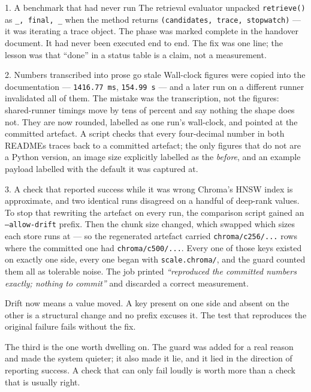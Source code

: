 \documentclass[11pt,a4paper]{article}
\newcommand{\code}[1]{\texttt{\small #1}}
\begin{document}
\begin{finding}{1. A benchmark that had never run}
The retrieval evaluator unpacked \code{retrieve()} as
\code{\_, final, \_} when the method returns
\code{(candidates, trace, stopwatch)} --- it was iterating a trace object. The
phase was marked complete in the handover document. It had never been executed
end to end. The fix was one line; the lesson was that ``done'' in a status table
is a claim, not a measurement.
\end{finding}

\begin{finding}{2. Numbers transcribed into prose go stale}
Wall-clock figures were copied into the documentation --- \code{1416.77\,ms},
\code{154.99\,s} --- and a later run on a different runner invalidated all of
them. The mistake was the transcription, not the figures: shared-runner timings
move by tens of percent and say nothing the shape does not. They are now rounded,
labelled as one run's wall-clock, and pointed at the committed artefact. A script
checks that every four-decimal number in both READMEs traces back to a committed
artefact; the only figures that do not are a Python version, an image size
explicitly labelled as the \emph{before}, and an example payload labelled with
the default it was captured at.
\end{finding}

\begin{finding}{3. A check that reported success while it was wrong}
Chroma's HNSW index is approximate, and two identical runs disagreed on a handful
of deep-rank values. To stop that rewriting the artefact on every run, the
comparison script gained an \code{--allow-drift} prefix. Then the chunk size
changed, which swapped which sizes each store runs at --- so the regenerated
artefact carried \code{chroma/c256/...} rows where the committed one had
\code{chroma/c500/...}. Every one of those keys existed on exactly one side,
every one began with \code{scale.chroma/}, and the guard counted them all as
tolerable noise. The job printed \emph{``reproduced the committed numbers
exactly; nothing to commit''} and discarded a correct measurement.

Drift now means a value moved. A key present on one side and absent on the other
is a structural change and no prefix excuses it. The test that reproduces the
original failure fails without the fix.
\end{finding}

The third is the one worth dwelling on. The guard was added for a real reason and
made the system quieter; it also made it lie, and it lied in the direction of
reporting success. A check that can only fail loudly is worth more than a check
that is usually right.
\end{document}
